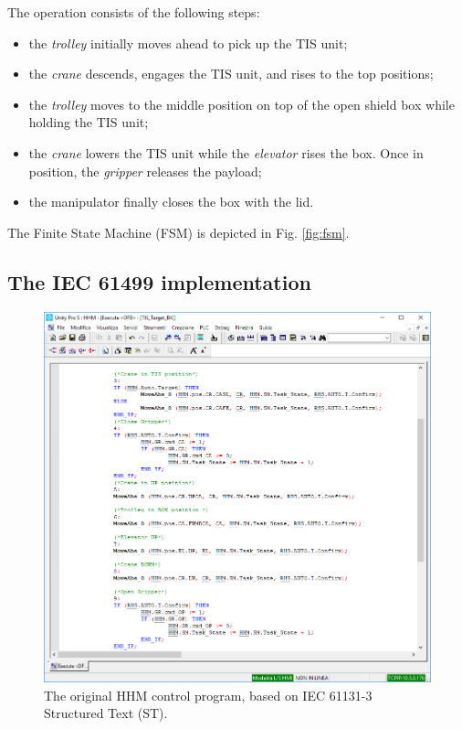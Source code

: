 \begin{bibunit}
\newpage

\noindent The operation consists of the following steps:
\begin{itemize}
  \item the \textit{trolley} initially moves ahead to pick up the TIS unit;
  \item the \textit{crane} descends, engages the TIS unit, and rises to the top positions;
  \item the \textit{trolley} moves to the middle position on top of the open shield box while holding the TIS unit;
  \item the \textit{crane} lowers the TIS unit while the \textit{elevator} rises the box. Once in position, the \textit{gripper} releases the payload;
  \item the manipulator finally closes the box with the lid.
\end{itemize}
The Finite State Machine (FSM) is depicted in Fig. \ref{fig:fsm}.


\subsection{The IEC 61499 implementation}

\begin{figure}[h!]
    \vspace*{-5mm}
	\centering
    \includegraphics[width=\columnwidth]{MX_Papers/Paper4/pictures/lilli04.png}
    \caption{The original HHM control program, based on IEC 61131-3 Structured Text (ST).} 
    \label{fig:iec61131}
\end{figure}


\end{bibunit}

